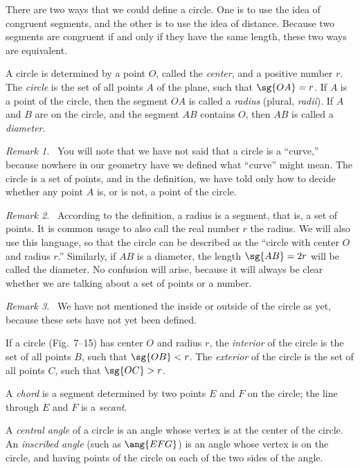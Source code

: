 \documentclass[11pt]{book}
\theoremstyle{bkplain}
\newenvironment{VIIremarkn}[1]%
  {\par\medskip\noindent\emph{Remark #1.}\ }{\par\medskip}
\theoremstyle{XIplainnote}
\theoremstyle{bkplain}
\theoremstyle{bkplain}
\begin{document}
There are two ways that we could define a circle. One is to use the idea of
congruent segments, and the other is to use the idea of distance. Because two
segments are congruent if and only if they have the same length, these two ways
are equivalent.

\begin{definition}
A circle is determined by a point $O$, called the \emph{center}, and a positive
number $r$. The \emph{circle} is the set of all points $A$ of the plane, such
that $\sg{OA} = r$. If $A$ is a point of the circle, then the segment $OA$ is
called a \emph{radius} (plural, \emph{radii}). If $A$ and $B$ are on the
circle, and the segment $AB$ contains $O$, then $AB$ is called a
\emph{diameter}.
\end{definition}

\begin{VIIremarkn}{1}
You will note that we have not said that a circle is a ``curve,'' because
nowhere in our geometry have we defined what ``curve'' might mean. The circle
is a set of points, and in the definition, we have told only how to decide
whether any point $A$ is, or is not, a point of the circle.
\end{VIIremarkn}

\begin{VIIremarkn}{2}
According to the definition, a radius is a segment, that is, a set of points.
It is common usage to also call the real number $r$ the radius. We will also
use this language, so that the circle can be described as the ``circle with
center $O$ and radius $r$.'' Similarly, if $AB$ is a diameter, the length
$\sg{AB} = 2r$ will be called the diameter. No confusion will arise, because it
will always be clear whether we are talking about a set of points or a number.
\end{VIIremarkn}

\begin{VIIremarkn}{3}
We have not mentioned the inside or outside of the circle as yet, because these
sets have not yet been defined.
\end{VIIremarkn}

\begin{definition}
If a circle (Fig.~7--15) has center $O$ and radius $r$, the \emph{interior} of
the circle is the set of all points $B$, such that $\sg{OB} < r$. The
\emph{exterior} of the circle is the set of all points $C$, such that
$\sg{OC} > r$.

A \emph{chord} is a segment determined by two points $E$ and $F$ on the circle;
the line through $E$ and $F$ is a \emph{secant}.

A \emph{central angle} of a circle is an angle whose vertex is at the center of
the circle. An \emph{inscribed angle} (such as $\ang{EFG}$) is an angle whose
vertex is on the circle, and having points of the circle on each of the two
sides of the angle.
\end{definition}
\end{document}
